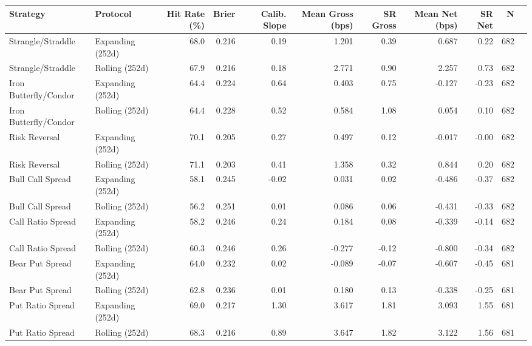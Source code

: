 \begin{tabular}{llrrrrrrrrr}
\toprule
Strategy & Protocol & Hit Rate (\%) & Brier & Calib. Slope & Mean Gross (bps) & SR Gross & Mean Net (bps) & SR Net & N \\
\midrule
Strangle/Straddle & Expanding (252d) & 68.0 & 0.216 & 0.19 & 1.201 & 0.39 & 0.687 & 0.22 & 682 \\
Strangle/Straddle & Rolling (252d) & 67.9 & 0.216 & 0.18 & 2.771 & 0.90 & 2.257 & 0.73 & 682 \\
Iron Butterfly/Condor & Expanding (252d) & 64.4 & 0.224 & 0.64 & 0.403 & 0.75 & -0.127 & -0.23 & 682 \\
Iron Butterfly/Condor & Rolling (252d) & 64.4 & 0.228 & 0.52 & 0.584 & 1.08 & 0.054 & 0.10 & 682 \\
Risk Reversal & Expanding (252d) & 70.1 & 0.205 & 0.27 & 0.497 & 0.12 & -0.017 & -0.00 & 682 \\
Risk Reversal & Rolling (252d) & 71.1 & 0.203 & 0.41 & 1.358 & 0.32 & 0.844 & 0.20 & 682 \\
Bull Call Spread & Expanding (252d) & 58.1 & 0.245 & -0.02 & 0.031 & 0.02 & -0.486 & -0.37 & 682 \\
Bull Call Spread & Rolling (252d) & 56.2 & 0.251 & 0.01 & 0.086 & 0.06 & -0.431 & -0.33 & 682 \\
Call Ratio Spread & Expanding (252d) & 58.2 & 0.246 & 0.24 & 0.184 & 0.08 & -0.339 & -0.14 & 682 \\
Call Ratio Spread & Rolling (252d) & 60.3 & 0.246 & 0.26 & -0.277 & -0.12 & -0.800 & -0.34 & 682 \\
Bear Put Spread & Expanding (252d) & 64.0 & 0.232 & 0.02 & -0.089 & -0.07 & -0.607 & -0.45 & 681 \\
Bear Put Spread & Rolling (252d) & 62.8 & 0.236 & 0.01 & 0.180 & 0.13 & -0.338 & -0.25 & 681 \\
Put Ratio Spread & Expanding (252d) & 69.0 & 0.217 & 1.30 & 3.617 & 1.81 & 3.093 & 1.55 & 681 \\
Put Ratio Spread & Rolling (252d) & 68.3 & 0.216 & 0.89 & 3.647 & 1.82 & 3.122 & 1.56 & 681 \\
\bottomrule
\end{tabular}
